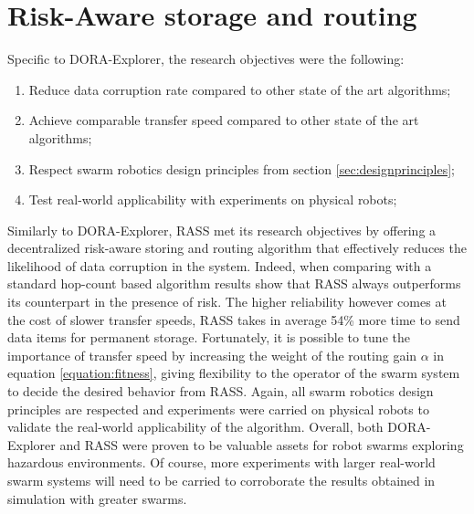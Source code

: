 \section{Risk-Aware storage and routing}
Specific to DORA-Explorer, the research objectives were the following:

\begin{enumerate}
    \item Reduce data corruption rate compared to other state of the art algorithms;
    \item Achieve comparable transfer speed compared to other state of the art algorithms;
    \item Respect swarm robotics design principles from section \ref{sec:designprinciples};
    \item Test real-world applicability with experiments on physical robots;
\end{enumerate}

Similarly to DORA-Explorer, RASS met its research objectives by offering a decentralized risk-aware storing and routing algorithm that effectively reduces the likelihood of data corruption in the system. Indeed, when comparing with a standard hop-count based algorithm results show that RASS always outperforms its counterpart in the presence of risk. The higher reliability however comes at the cost of slower transfer speeds, RASS takes in average 54\% more time to send data items for permanent storage. Fortunately, it is possible to tune the importance of transfer speed by increasing the weight of the routing gain $\alpha$ in equation \ref{equation:fitness}, giving flexibility to the operator of the swarm system to decide the desired behavior from RASS. Again, all swarm robotics design principles are respected and experiments were carried on physical robots to validate the real-world applicability of the algorithm. Overall, both DORA-Explorer and RASS were proven to be valuable assets for robot swarms exploring hazardous environments. Of course, more experiments with larger real-world swarm systems will need to be carried to corroborate the results obtained in simulation with greater swarms. 